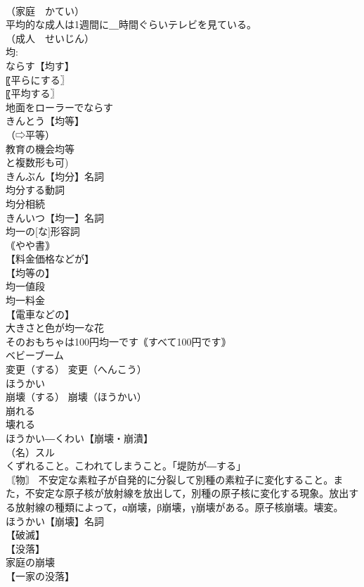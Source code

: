 \documentclass[8pt]{extreport}
\begin{document}
\begin{CJK}{UTF8}{min}
\\	（家庭　かてい）
\\	平均的な成人は1週間に＿時間ぐらいテレビを見ている。
\\	（成人　せいじん）
\\	均:
\\	ならす【均す】
\\	〖平らにする〗
\\	〖平均する〗
\\	地面をローラーでならす
\\	きんとう【均等】
\\	（⇨平等）
\\	教育の機会均等
\\	と複数形も可)
\\	きんぶん【均分】名詞
\\	均分する動詞
\\	均分相続
\\	きんいつ【均一】名詞
\\	均一の[な]形容詞
\\	｟やや書｠
\\	【料金価格などが】
\\	【均等の】
\\	均一値段
\\	均一料金
\\	【電車などの】
\\	大きさと色が均一な花
\\	そのおもちゃは100円均一です｟すべて100円です｠
\\	ベビーブーム		
\\	変更（する）		変更（へんこう）
\\	ほうかい
\\	崩壊（する）		崩壊（ほうかい）
\\	崩れる
\\	壊れる
\\	ほうかい―くわい【崩壊・崩潰】
\\	（名）スル
\\	くずれること。こわれてしまうこと。「堤防が―する」
\\	〘物〙 不安定な素粒子が自発的に分裂して別種の素粒子に変化すること。また，不安定な原子核が放射線を放出して，別種の原子核に変化する現象。放出する放射線の種類によって，α崩壊，β崩壊，γ崩壊がある。原子核崩壊。壊変。
\\	ほうかい【崩壊】名詞
\\	【破滅】
\\	【没落】
\\	家庭の崩壊
\\	【一家の没落】

\end{CJK}
\end{document}
